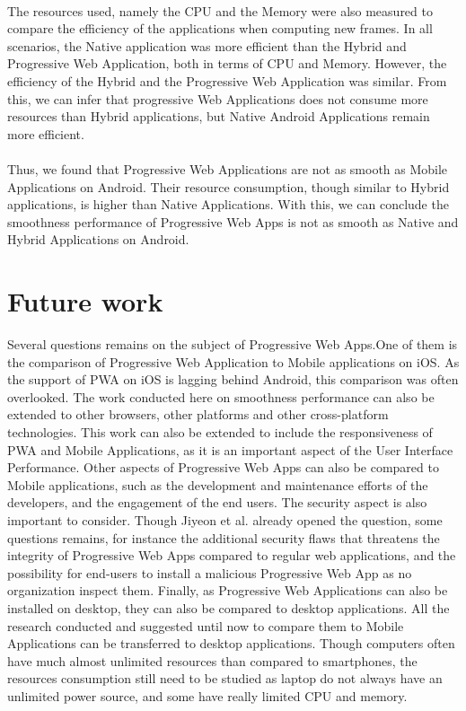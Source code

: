 \documentclass{kththesis}
\begin{document}
\paragraph{}
The resources used, namely the CPU and the Memory were also measured to compare the efficiency of the applications when computing new frames. In all scenarios, the Native application was more efficient than the Hybrid and Progressive Web Application, both in terms of CPU and Memory. However, the efficiency of the Hybrid and the Progressive Web Application was similar. From this, we can infer that progressive Web Applications does not consume more resources than Hybrid applications, but Native Android Applications remain more efficient.

\paragraph{}
Thus, we found that Progressive Web Applications are not as smooth as Mobile Applications on Android. Their resource consumption, though similar to Hybrid applications, is higher than Native Applications. With this, we can conclude the smoothness performance of Progressive Web Apps is not as smooth as Native and Hybrid Applications on Android. 

\section{Future work}
Several questions remains on the subject of Progressive Web Apps.One of them is the comparison of Progressive Web Application to Mobile applications on iOS. As the support of PWA on iOS is lagging behind Android, this comparison was often overlooked. \newline
The work conducted here on smoothness performance can also be extended to other browsers, other platforms and other cross-platform technologies. This work can also be extended to include the responsiveness of PWA and Mobile Applications, as it is an important aspect of the User Interface Performance. \newline
Other aspects of Progressive Web Apps can also be compared to Mobile applications, such as the development and maintenance efforts of the developers, and the engagement of the end users. \newline
The security aspect is also important to consider. Though Jiyeon et al. \cite{Pride_Prejudice} already opened the question, some questions remains, for instance the additional security flaws that threatens the integrity of Progressive Web Apps compared to regular web applications, and the possibility for end-users to install a malicious Progressive Web App as no organization inspect them.
Finally, as Progressive Web Applications can also be installed on desktop, they can also be compared to desktop applications. All the research conducted and suggested until now to compare them to Mobile Applications can be transferred to desktop applications. Though computers often have much almost unlimited resources than compared to smartphones, the resources consumption still need to be studied as laptop do not always have an unlimited power source, and some have really limited CPU and memory. 
\end{document}
